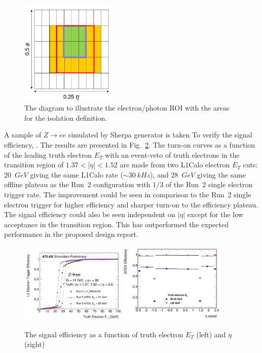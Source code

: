 \begin{figure}[!h]                
	\includegraphics[width=0.4\textwidth]{Chapter6/ele_iso.png}
	\begin{center}
		\caption{The diagram to illustrate the electron/photon ROI with the areas for the isolation definition.}
		\label{Fig:ele_iso}            
	\end{center}
\end{figure}
\noindent
A sample of $Z\to ee$ simulated by Sherpa generator is taken To verify the signal efficiency, . The results are presented in Fig.~\ref{Fig:ele_perf}. The turn-on curves as a function of the leading truth electron $E_T$ with an event-veto of truth electrons in the transition region of $1.37<|\eta|<1.52$ are made from two L1Calo electron $E_{T}$ cuts: 20~$GeV$ giving the same L1Calo rate ($\sim30~kHz$), and 28~$GeV$ giving the same offline plateau as the Run~2 configuration with $1/3$ of the Run~2 single electron trigger rate. The improvement could be seen in comparison to the Run~2 single electron trigger for higher efficiency and sharper turn-on to the efficiency plateau. The signal efficiency could also be seen independent on $|\eta|$ except for the low acceptance in the transition region. This has outperformed the expected performance in the proposed design report. 
\begin{figure}[!h]                
	\includegraphics[width=0.45\textwidth]{Chapter6/ele_turnon.png}
	\includegraphics[width=0.45\textwidth]{Chapter6/ele_eta.png}
	\begin{center}
		\caption{The signal efficiency as a function of truth electron $E_{T}$ (left) and $\eta$ (right)}
		\label{Fig:ele_perf}            
	\end{center}
\end{figure}
